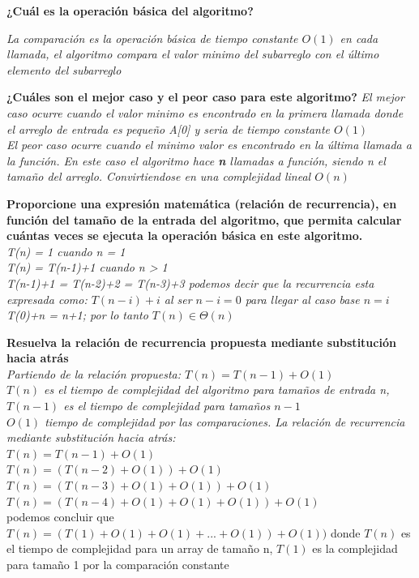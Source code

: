\documentclass{article}
\begin{document}
\begin{question}
  \textbf{¿Cuál es la operación básica del algoritmo?}
  
  \textit{La comparación es la operación básica de tiempo constante $O(1)$ en cada llamada, el algoritmo compara el valor minimo del subarreglo con el último elemento del subarreglo}
    
\end{question}
\begin{question}
  \textbf{¿Cuáles son el mejor caso y el peor caso para este algoritmo?}
  \textit{El mejor caso ocurre cuando el valor minimo es encontrado en la primera llamada donde el arreglo de entrada es pequeño A[0] y seria de tiempo constante $O(1)$}\\
  \textit{El peor caso ocurre cuando el minimo valor es encontrado en la última llamada a la función. En este caso el algoritmo hace \textbf{n} llamadas a función, siendo n el tamaño del arreglo. Convirtiendose en una complejidad lineal $O(n)$}
    
\end{question}
\begin{question}
  \textbf{Proporcione una expresión matemática (relación de recurrencia), en función del tamaño de la entrada del algoritmo, que permita calcular cuántas veces se ejecuta la operación básica en este algoritmo.}\\
  \textit{T(n) = 1 cuando n = 1}\\
  \textit{T(n) = T(n-1)+1 cuando n > 1}\\
  \textit{T(n-1)+1 = T(n-2)+2 = T(n-3)+3 podemos decir que la recurrencia esta expresada como: $T(n-i)+i$ al ser $n-i=0$ para llegar al caso base $n=i$}\\
  \textit{T(0)+n = n+1; por lo tanto $T(n) \in \Theta(n)$ }
\end{question}
\begin{question}
  \textbf{Resuelva la relación de recurrencia propuesta mediante substitución hacia atrás}\\
  \textit{Partiendo de la relación propuesta: $T(n) = T(n-1)+O(1)$}\\
  \textit{$T(n)$ es el tiempo de complejidad del algoritmo para tamaños de entrada n, $T(n-1)$ es el tiempo de complejidad para tamaños $n-1$ }\\
  \textit{$O(1)$ tiempo de complejidad por las comparaciones. La relación de recurrencia mediante substitución hacia atrás:}\\
  $T(n)=T(n-1)+O(1)$\\
  $T(n)=(T(n-2)+O(1))+O(1)$\\
  $T(n)=(T(n-3)+O(1)+O(1))+O(1)$\\
  $T(n)=(T(n-4)+O(1)+O(1)+O(1))+O(1)$\\
  podemos concluir que $T(n) = (T(1)+O(1)+O(1)+...+O(1))+O(1))$ donde $T(n)$ es el tiempo de complejidad para un array de tamaño n, $T(1)$ es la complejidad para tamaño 1 por la comparación constante
\end{question}
\end{document}
